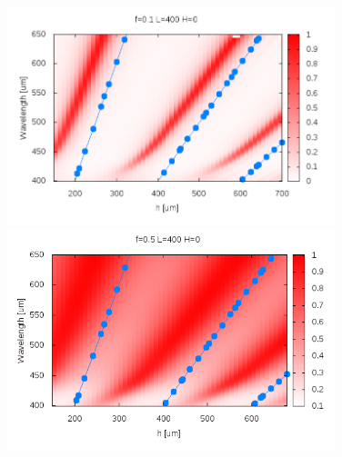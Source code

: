 \documentclass{beamer}
\begin{document}
\begin{frame}
\begin{columns}
\begin{column}{0.5\textwidth}
\begin{figure}
			\end{figure}
		\end{column}
		\begin{column}{0.5\textwidth}
			\begin{figure}
				\includegraphics[width=\textwidth]{../images/antenaThz/rezonant_trans_f01.png}\\
				\includegraphics[width=\textwidth]{../images/antenaThz/rezonant_trans_f05.png}\\
			\end{figure}
		\end{column}
	\end{columns}
		
\end{frame}
\end{document}
